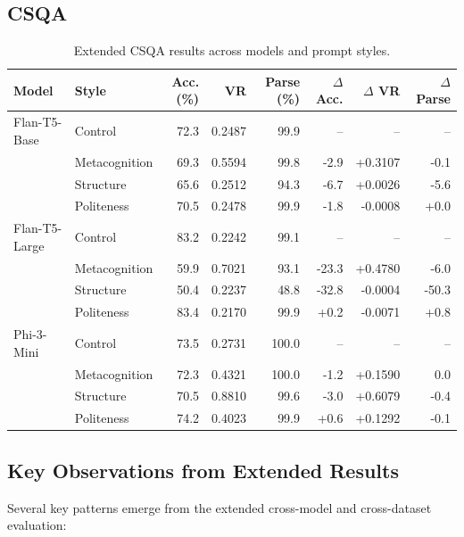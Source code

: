 \documentclass[11pt]{article}
\begin{document}
\clearpage
\subsection{CSQA}

\begin{table}[h]
\centering
\small
\setlength{\tabcolsep}{5pt}
\begin{tabular}{llrrrrrr}
\toprule
Model & Style & Acc. (\%) & VR & Parse (\%) & $\Delta$ Acc. & $\Delta$ VR & $\Delta$ Parse \\
\midrule
Flan-T5-Base & Control & 72.3 & 0.2487 & 99.9 & -- & -- & -- \\
 & Metacognition & 69.3 & 0.5594 & 99.8 & -2.9 & +0.3107 & -0.1 \\
 & Structure & 65.6 & 0.2512 & 94.3 & -6.7 & +0.0026 & -5.6 \\
 & Politeness & 70.5 & 0.2478 & 99.9 & -1.8 & -0.0008 & +0.0 \\
\midrule
Flan-T5-Large & Control & 83.2 & 0.2242 & 99.1 & -- & -- & -- \\
 & Metacognition & 59.9 & 0.7021 & 93.1 & -23.3 & +0.4780 & -6.0 \\
 & Structure & 50.4 & 0.2237 & 48.8 & -32.8 & -0.0004 & -50.3 \\
 & Politeness & 83.4 & 0.2170 & 99.9 & +0.2 & -0.0071 & +0.8 \\
\midrule
Phi-3-Mini & Control & 73.5 & 0.2731 & 100.0 & -- & -- & -- \\
 & Metacognition & 72.3 & 0.4321 & 100.0 & -1.2 & +0.1590 & 0.0 \\
 & Structure & 70.5 & 0.8810 & 99.6 & -3.0 & +0.6079 & -0.4 \\
 & Politeness & 74.2 & 0.4023 & 99.9 & +0.6 & +0.1292 & -0.1 \\
\bottomrule
\end{tabular}
\caption{Extended CSQA results across models and prompt styles.}
\label{tab:app-csqa-results}
\end{table}

\subsection{Key Observations from Extended Results}
\label{app:key-observations}

Several key patterns emerge from the extended cross-model and cross-dataset evaluation:
\end{document}
